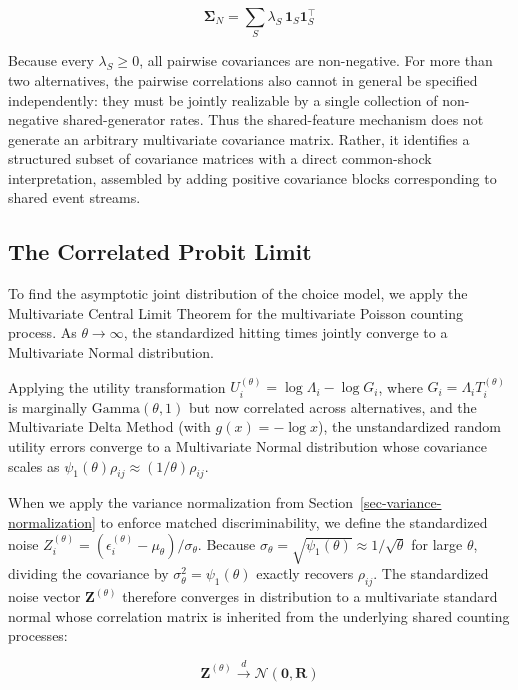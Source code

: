 \documentclass[
  man,
  floatsintext,
  longtable,
  a4paper,
  nolmodern,
  notxfonts,
  notimes,
  colorlinks=true,linkcolor=blue,citecolor=blue,urlcolor=blue]{apa7}
\begin{document}
\[\boldsymbol{\Sigma}_N = \sum_S \lambda_S \, \mathbf{1}_S \mathbf{1}_S^\top\]

Because every \(\lambda_S \ge 0\), all pairwise covariances are
non-negative. For more than two alternatives, the pairwise correlations
also cannot in general be specified independently: they must be jointly
realizable by a single collection of non-negative shared-generator
rates. Thus the shared-feature mechanism does not generate an arbitrary
multivariate covariance matrix. Rather, it identifies a structured
subset of covariance matrices with a direct common-shock interpretation,
assembled by adding positive covariance blocks corresponding to shared
event streams.

\subsection{The Correlated Probit
Limit}\label{the-correlated-probit-limit}

To find the asymptotic joint distribution of the choice model, we apply
the Multivariate Central Limit Theorem for the multivariate Poisson
counting process. As \(\theta \to \infty\), the standardized hitting
times jointly converge to a Multivariate Normal distribution.

Applying the utility transformation
\(U_i^{(\theta)} = \log \Lambda_i - \log G_i\), where
\(G_i = \Lambda_i T_i^{(\theta)}\) is marginally
\(\text{Gamma}(\theta, 1)\) but now correlated across alternatives, and
the Multivariate Delta Method (with \(g(x) = -\log x\)), the
unstandardized random utility errors converge to a Multivariate Normal
distribution whose covariance scales as
\(\psi_1(\theta) \rho_{ij} \approx (1/\theta)\rho_{ij}\).

When we apply the variance normalization from
Section~\ref{sec-variance-normalization} to enforce matched
discriminability, we define the standardized noise
\(Z_i^{(\theta)} = (\epsilon_i^{(\theta)} - \mu_\theta) / \sigma_\theta\).
Because
\(\sigma_\theta = \sqrt{\psi_1(\theta)} \approx 1/\sqrt{\theta}\) for
large \(\theta\), dividing the covariance by
\(\sigma_\theta^2 = \psi_1(\theta)\) exactly recovers \(\rho_{ij}\). The
standardized noise vector \(\mathbf{Z}^{(\theta)}\) therefore converges
in distribution to a multivariate standard normal whose correlation
matrix is inherited from the underlying shared counting processes:

\[\mathbf{Z}^{(\theta)} \xrightarrow{d} \mathcal{N}(\mathbf{0}, \mathbf{R})\]
\end{document}
